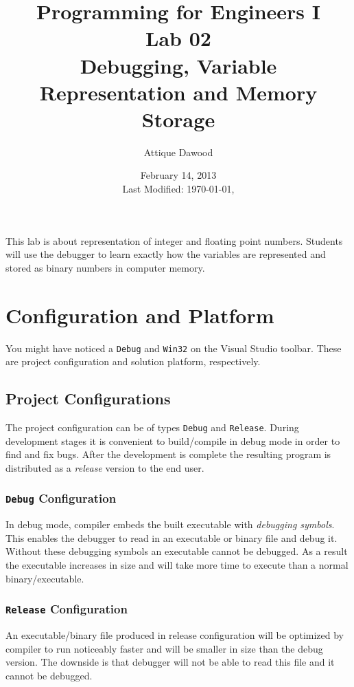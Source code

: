 \documentclass[12pt,a4paper]{article}
\title{\vspace{-1cm}Programming for Engineers I\\Lab 02\\Debugging, Variable Representation and Memory Storage}
\author{Attique Dawood}
\date{February 14, 2013\\[0.2cm] Last Modified: \today, \currenttime}
\begin{document}
\maketitle

This lab is about representation of integer and floating point numbers. Students will use the debugger to learn exactly how the variables are represented and stored as binary numbers in computer memory\footnotemark.


\section{Configuration and Platform}
You might have noticed a \verb|Debug| and \verb|Win32| on the Visual Studio toolbar. These are project configuration and solution platform, respectively.
\subsection{Project Configurations}
The project configuration can be of types \verb|Debug| and \verb|Release|. During development stages it is convenient to build/compile in debug mode in order to find and fix bugs. After the development is complete the resulting program is distributed as a \emph{release} version to the end user.
\subsubsection{\texttt{Debug} Configuration}
In debug mode, compiler embeds the built executable with \emph{debugging symbols}. This enables the debugger to read in an executable or binary file and debug it. Without these debugging symbols an executable cannot be debugged. As a result the executable increases in size and will take more time to execute than a normal binary/executable.
\subsubsection{\texttt{Release} Configuration}
An executable/binary file produced in release configuration will be optimized by compiler to run noticeably faster and will be smaller in size than the debug version. The downside is that debugger will not be able to read this file and it cannot be debugged.
\end{document}
